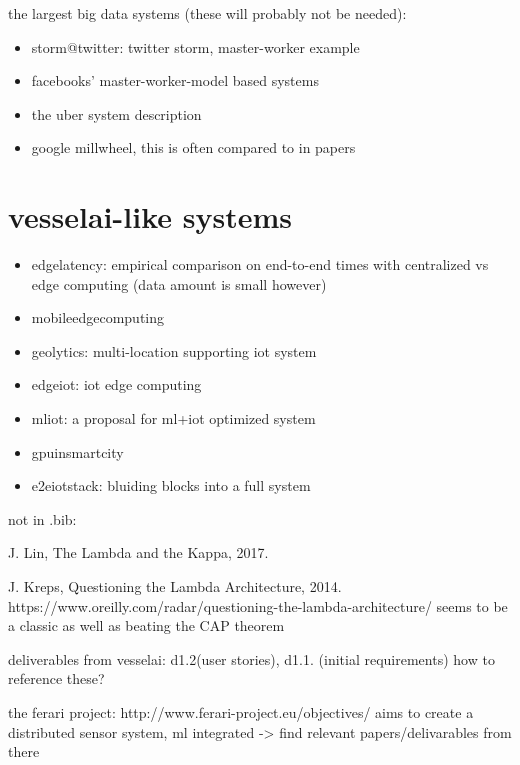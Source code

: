 \documentclass{article}
\begin{document}
the largest big data systems (these will probably not be needed):

\begin{itemize}
    \item \cite{storm@twitter} storm@twitter: twitter storm, master-worker example
    \item \cite{facebook} facebooks' master-worker-model based systems
    \item \cite{uber} the uber system description
    \item \cite{millwheel} google millwheel, this is often compared to in papers 
\end{itemize} 


\chapter{vesselai-like systems}

\begin{itemize}
    \item \cite{edgelatency} edgelatency: empirical comparison on end-to-end times with centralized vs edge computing (data amount is small however)
    \item \cite{mobileedgecomputing} mobileedgecomputing
    \item \cite{geolytics} geolytics: multi-location supporting iot system
    \item \cite{edgeiot} edgeiot: iot edge computing
    \item \cite{mliot} mliot: a proposal for ml+iot optimized system
    \item \cite{gpuinsmartcity} gpuinsmartcity
    \item \cite{e2eiotstack} e2eiotstack: bluiding blocks into a full system
\end{itemize}

not in .bib:

J. Lin, The Lambda and the Kappa, 2017.  

J. Kreps, Questioning the Lambda Architecture, 2014.  https://www.oreilly.com/radar/questioning-the-lambda-architecture/
seems to be a classic as well as beating the CAP theorem

deliverables from vesselai: d1.2(user stories), d1.1. (initial requirements) how to reference these?

the ferari project: http://www.ferari-project.eu/objectives/ aims to create a distributed sensor system, ml integrated
-> find relevant papers/delivarables from there

\printbibliography
\end{document}
